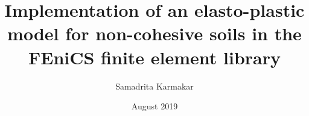 \documentclass[a4paper,12pt]{book}
\begin{document}
\author{Samadrita Karmakar}
\title{Implementation of an elasto-plastic model for non-cohesive soils in the FEniCS finite element library}
\date{August 2019}

\frontmatter
\maketitle
\tableofcontents

\mainmatter





\backmatter
\end{document}
